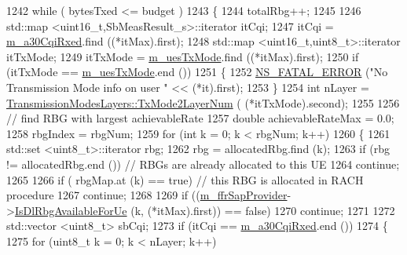 \begin{DoxyCode}
1242       \textcolor{keywordflow}{while} ( bytesTxed <= budget )
1243         \{
1244           totalRbg++;
1245 
1246           std::map <uint16\_t,SbMeasResult\_s>::iterator itCqi;
1247           itCqi = \hyperlink{classns3_1_1FdTbfqFfMacScheduler_a2c52c04323552283ec3f14a7ce083bc2}{m\_a30CqiRxed}.find ((*itMax).first);
1248           std::map <uint16\_t,uint8\_t>::iterator itTxMode;
1249           itTxMode = \hyperlink{classns3_1_1FdTbfqFfMacScheduler_a08550374df1be10395aa320fc1722066}{m\_uesTxMode}.find ((*itMax).first);
1250           \textcolor{keywordflow}{if} (itTxMode == \hyperlink{classns3_1_1FdTbfqFfMacScheduler_a08550374df1be10395aa320fc1722066}{m\_uesTxMode}.end ())
1251             \{
1252               \hyperlink{group__fatal_ga5131d5e3f75d7d4cbfd706ac456fdc85}{NS\_FATAL\_ERROR} (\textcolor{stringliteral}{"No Transmission Mode info on user "} << (*it).first);
1253             \}
1254           \textcolor{keywordtype}{int} nLayer = \hyperlink{classns3_1_1TransmissionModesLayers_a31f608b7bfaa77440fe4cb85ad035329}{TransmissionModesLayers::TxMode2LayerNum} (
      (*itTxMode).second);
1255 
1256                  \textcolor{comment}{// find RBG with largest achievableRate}
1257           \textcolor{keywordtype}{double} achievableRateMax = 0.0;
1258           rbgIndex = rbgNum;
1259                 \textcolor{keywordflow}{for} (\textcolor{keywordtype}{int} k = 0; k < rbgNum; k++)
1260                   \{
1261               std::set <uint8\_t>::iterator rbg;
1262               rbg = allocatedRbg.find (k);
1263                     \textcolor{keywordflow}{if} (rbg != allocatedRbg.end ())  \textcolor{comment}{// RBGs are already allocated to this UE}
1264                       \textcolor{keywordflow}{continue};
1265 
1266               \textcolor{keywordflow}{if} ( rbgMap.at (k) == \textcolor{keyword}{true}) \textcolor{comment}{// this RBG is allocated in RACH procedure}
1267                 \textcolor{keywordflow}{continue};
1268 
1269               \textcolor{keywordflow}{if} ((\hyperlink{classns3_1_1FdTbfqFfMacScheduler_a15bcdfbb46c65cae0d42e26b321f7827}{m\_ffrSapProvider}->\hyperlink{classns3_1_1LteFfrSapProvider_a91f4de3c794d2a32fae5bcfafd88b6fa}{IsDlRbgAvailableForUe} (k, 
      (*itMax).first)) == \textcolor{keyword}{false})
1270                 \textcolor{keywordflow}{continue};
1271 
1272               std::vector <uint8\_t> sbCqi;
1273               \textcolor{keywordflow}{if} (itCqi == \hyperlink{classns3_1_1FdTbfqFfMacScheduler_a2c52c04323552283ec3f14a7ce083bc2}{m\_a30CqiRxed}.end ())
1274                 \{
1275                   \textcolor{keywordflow}{for} (uint8\_t k = 0; k < nLayer; k++)

\end{DoxyCode}
